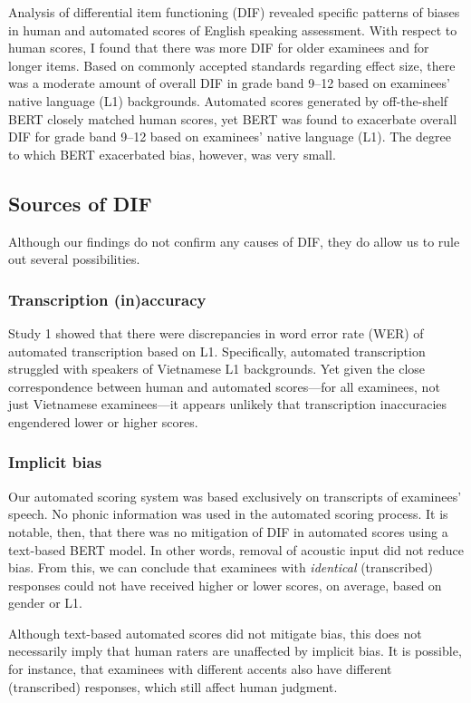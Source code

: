\documentclass [PhD] {uclathes}
\begin{document}
Analysis of differential item functioning (DIF) revealed specific patterns of biases in human and automated scores of English speaking assessment. With respect to human scores, I found that there was more DIF for older examinees and for longer items. Based on commonly accepted standards regarding effect size, there was a moderate amount of overall DIF in grade band 9–12 based on examinees’ native language (L1) backgrounds. Automated scores generated by off-the-shelf BERT closely matched human scores, yet BERT was found to exacerbate overall DIF for grade band 9–12 based on examinees’ native language (L1). The degree to which BERT exacerbated bias, however, was very small.

\subsection{Sources of DIF}

Although our findings do not confirm any causes of DIF, they do allow us to rule out several possibilities. 

\subsubsection{Transcription (in)accuracy}

Study 1 showed that there were discrepancies in word error rate (WER) of automated transcription based on L1. Specifically, automated transcription struggled with speakers of Vietnamese L1 backgrounds. Yet given the close correspondence between human and automated scores—for all examinees, not just Vietnamese examinees—it appears unlikely that transcription inaccuracies engendered lower or higher scores. 

\subsubsection{Implicit bias}

Our automated scoring system was based exclusively on transcripts of examinees’ speech. No phonic information was used in the automated scoring process. It is notable, then, that there was no mitigation of DIF in automated scores using a text-based BERT model. In other words, removal of acoustic input did not reduce bias. From this, we can conclude that examinees with \emph{identical} (transcribed) responses could not have received higher or lower scores, on average, based on gender or L1. 

Although text-based automated scores did not mitigate bias, this does not necessarily imply that human raters are unaffected by implicit bias. It is possible, for instance, that examinees with different accents also have different (transcribed) responses, which still affect human judgment. 
\end{document}
